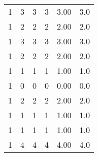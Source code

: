 \begin{tabular}{rrrrrr}
         1 &           3 &    3 &    3 &   3.00 &      3.0 \\
         1 &           2 &    2 &    2 &   2.00 &      2.0 \\
         1 &           3 &    3 &    3 &   3.00 &      3.0 \\
         1 &           2 &    2 &    2 &   2.00 &      2.0 \\
         1 &           1 &    1 &    1 &   1.00 &      1.0 \\
         1 &           0 &    0 &    0 &   0.00 &      0.0 \\
         1 &           2 &    2 &    2 &   2.00 &      2.0 \\
         1 &           1 &    1 &    1 &   1.00 &      1.0 \\
         1 &           1 &    1 &    1 &   1.00 &      1.0 \\
         1 &           4 &    4 &    4 &   4.00 &      4.0 \\
\bottomrule
\end{tabular}
